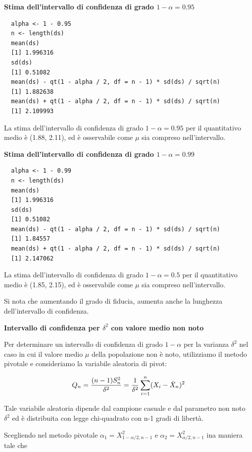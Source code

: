 \vspace{5mm}
\noindent \textbf{Stima dell'intervallo di confidenza di grado $1 - \alpha = 0.95$}

\begin{lstlisting}
  alpha <- 1 - 0.95
  n <- length(ds)
  mean(ds)
  [1] 1.996316
  sd(ds)
  [1] 0.51082
  mean(ds) - qt(1 - alpha / 2, df = n - 1) * sd(ds) / sqrt(n)
  [1] 1.882638
  mean(ds) + qt(1 - alpha / 2, df = n - 1) * sd(ds) / sqrt(n)
  [1] 2.109993
\end{lstlisting}

La stima dell'intervallo di confidenza di grado $1-\alpha = 0.95$ per il quantitativo medio è (1.88, 2.11), ed è osservabile come $\mu$ sia compreso nell'intervallo.

\vspace{5mm}
\noindent \textbf{Stima dell'intervallo di confidenza di grado $1 - \alpha = 0.99$}

\begin{lstlisting}
  alpha <- 1 - 0.99
  n <- length(ds)
  mean(ds)
  [1] 1.996316
  sd(ds)
  [1] 0.51082
  mean(ds) - qt(1 - alpha / 2, df = n - 1) * sd(ds) / sqrt(n)
  [1] 1.84557
  mean(ds) + qt(1 - alpha / 2, df = n - 1) * sd(ds) / sqrt(n)
  [1] 2.147062
\end{lstlisting}

La stima dell'intervallo di confidenza di grado $1-\alpha = 0.5$ per il quantitativo medio è (1.85, 2.15), ed è osservabile come $\mu$ sia compreso nell'intervallo.

Si nota che aumentando il grado di fiducia, aumenta anche la lunghezza dell'intervallo di confidenza.

\vspace{5mm}
\noindent \textbf{Intervallo di confidenza per $\delta^2$ con valore medio non noto}

Per determinare un intervallo di confidenza di grado $1-\alpha$ per la varianza $\delta^2$ nel caso in cui il valore medio $\mu$ della popolazione non è noto, utilizziamo il metodo pivotale e consideriamo la variabile aleatoria di pivot:

\[Q_n = \frac{(n-1)S_n^2}{\delta^2} = \frac{1}{\delta^2}\sum_{i=1}^n(X_i - \Bar{X}_n)^2\]

Tale variabile aleatoria dipende dal campione casuale e dal parametro non noto $\delta^2$ ed è distribuita con legge chi-quadrato con n-1 gradi di libertà.

Scegliendo nel metodo pivotale $\alpha_1 = X^2_{1-\alpha/2,n-1}$ e $\alpha_2 = X^2_{\alpha/2,n-1}$ ina maniera tale che


